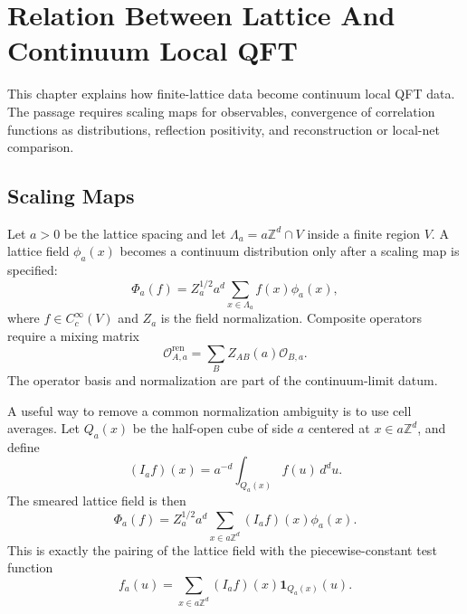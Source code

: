 \chapter{Relation Between Lattice And Continuum Local QFT}
\label{ch:constructive-lattice-continuum-local-qft}

\ConventionsEuclidean

This chapter explains how finite-lattice data become continuum local QFT
data.  The passage requires scaling maps for observables, convergence of
correlation functions as distributions, reflection positivity, and
reconstruction or local-net comparison.

\section{Scaling Maps}

Let \(a>0\) be the lattice spacing and let \(\Lambda_a=a\mathbb Z^d\cap V\)
inside a finite region \(V\).  A lattice field \(\phi_a(x)\) becomes a
continuum distribution only after a scaling map is specified:
\[
  \Phi_a(f)
  =
  Z_a^{1/2}a^d\sum_{x\in\Lambda_a} f(x)\phi_a(x),
\]
where \(f\in C_c^\infty(V)\) and \(Z_a\) is the field normalization.  Composite
operators require a mixing matrix
\[
  \mathcal O_{A,a}^{\mathrm{ren}}
  =
  \sum_B Z_{AB}(a)\mathcal O_{B,a}.
\]
The operator basis and normalization are part of the continuum-limit datum.

A useful way to remove a common normalization ambiguity is to use cell
averages.  Let \(Q_a(x)\) be the half-open cube of side \(a\) centered at
\(x\in a\mathbb Z^d\), and define
\begin{equation}
  (I_af)(x)=a^{-d}\int_{Q_a(x)} f(u)\,d^du .
  \label{eq:cell-average-map}
\end{equation}
The smeared lattice field is then
\begin{equation}
  \Phi_a(f)
  =
  Z_a^{1/2}a^d\sum_{x\in a\mathbb Z^d}(I_af)(x)\phi_a(x).
  \label{eq:cell-average-smeared-field}
\end{equation}
This is exactly the pairing of the lattice field with the piecewise-constant
test function
\begin{equation}
  f_a(u)=\sum_{x\in a\mathbb Z^d}(I_af)(x)\mathbf 1_{Q_a(x)}(u).
  \label{eq:piecewise-constant-test-function}
\end{equation}

